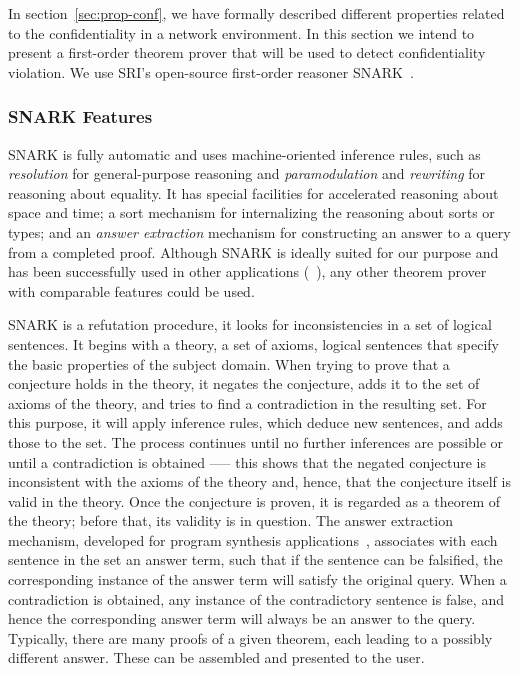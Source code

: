 \label{sec:proof-detects-violation}
In section~\ref{sec:prop-conf}, we have formally described different properties related to the confidentiality in a network environment.
In this section we intend to present a first-order theorem prover that will be used to detect confidentiality violation.
We use SRI's open-source first-order reasoner SNARK~\cite{snark-Stickel2000}.
\subsubsection{SNARK Features}
SNARK is fully automatic and uses machine-oriented inference rules, such as \textit{resolution} for general-purpose reasoning and \textit{paramodulation} and \textit{rewriting} for reasoning about equality.
It has special facilities
for accelerated reasoning about space and time; a sort mechanism for internalizing the reasoning about sorts or types; and an \textit{answer extraction} mechanism for constructing an answer to a query from a completed proof. 
Although SNARK is ideally suited for our purpose and has been successfully used in other applications (\eg~\cite{AICPub2006:2015}), any other theorem prover with comparable features could be used.

SNARK is a refutation procedure, \ie it looks for inconsistencies in a set of logical sentences. It begins with a theory, a set of axioms, \ie logical sentences that specify the basic properties of the subject domain. 
When trying to prove that a conjecture holds in the theory, it negates the conjecture, adds it to the set of axioms of the theory, and tries to find a contradiction in the resulting set. 
For this purpose, it will apply inference rules, which deduce new sentences, and adds those to the set. The process continues until no further inferences are possible or until a contradiction is obtained \-—-- this shows that the negated conjecture is inconsistent with the axioms of the theory and, hence, that the conjecture itself is valid in the theory. 
Once the conjecture is proven, it is regarded as a theorem of the theory; before that, its validity is in question.
The answer extraction mechanism, developed for program synthesis applications~\cite{Manna:1980:DAP:357084.357090}, associates with each sentence in the set an answer term, such that if the sentence can be falsified, the corresponding instance of the answer term will satisfy the original query. 
When a contradiction is obtained, any instance of the contradictory sentence is false, and hence the corresponding answer term will always  be an answer to the query. 
Typically, there are many proofs of a given theorem, each leading to a possibly different answer. 
These can be assembled and presented to the user.

